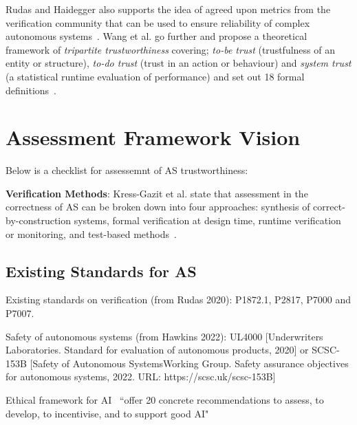 Rudas and Haidegger also supports the idea of agreed upon metrics from the verification community that can be used to ensure reliability of complex autonomous systems~\cite{Rudas2020}. Wang et al. go further and propose a  theoretical framework of \emph{tripartite trustworthiness} covering; \emph{to-be trust} (trustfulness of an entity or structure), \emph{to-do trust} (trust in an action or behaviour) and \emph{system trust} (a statistical runtime evaluation of performance) and set out 18 formal definitions~\cite{Wang2020}. 



\section{Assessment Framework Vision}\label{Assessment_Framework_Vision}


Below is a checklist for assessemnt of AS trustworthiness:





\noindent\textbf{Verification Methods}: %
Kress-Gazit et al. state that assessment in the correctness of AS can be broken down into four approaches: synthesis of correct-by-construction systems, formal verification at design time, runtime verification or monitoring, and test-based methods~\cite{kress2021formalizing}. 







\subsection{Existing Standards for AS}
Existing standards on verification (from Rudas 2020): P1872.1, P2817, P7000 and P7007.

Safety of autonomous systems (from Hawkins 2022): UL4000 [Underwriters Laboratories. Standard for evaluation of autonomous products, 2020] or SCSC-153B [Safety of Autonomous SystemsWorking Group. Safety assurance objectives for autonomous systems, 2022. URL: https://scsc.uk/scsc-153B]


Ethical framework for AI~\cite{Floridi2018} ``offer 20 concrete recommendations to assess, to develop, to incentivise, and to support good AI"

